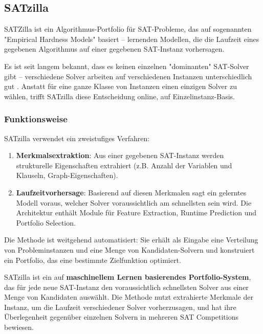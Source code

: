 \newpage

\subsection{SATzilla}

SATZilla ist ein Algorithmus-Portfolio für SAT-Probleme, das auf sogenannten "Empirical Hardness Models" 
basiert – lernenden Modellen, die die Laufzeit eines gegebenen Algorithmus auf einer gegebenen 
SAT-Instanz vorhersagen. \cite{Nudelman2004SATzillaA}

Es ist seit langem bekannt, dass es keinen einzelnen "dominanten" SAT-Solver gibt – verschiedene Solver 
arbeiten auf verschiedenen Instanzen unterschiedlich gut . Anstatt für eine ganze Klasse von Instanzen 
einen einzigen Solver zu wählen, trifft SATzilla diese Entscheidung online, auf Einzelinstanz-Basis.\cite{xu2008satzilla}

\subsubsection{Funktionsweise}

SATzilla verwendet ein zweistufiges Verfahren:

\begin{enumerate}
    \item \textbf{Merkmalsextraktion}: Aus einer gegebenen SAT-Instanz werden strukturelle Eigenschaften extrahiert (z.B. Anzahl der Variablen und Klauseln, Graph-Eigenschaften).
    \item \textbf{Laufzeitvorhersage}: Basierend auf diesen Merkmalen sagt ein gelerntes Modell voraus, welcher Solver voraussichtlich am schnellsten sein wird. Die Architektur enthält Module für Feature Extraction, Runtime Prediction und Portfolio Selection.
\end{enumerate}

Die Methode ist weitgehend automatisiert: Sie erhält als Eingabe eine Verteilung von Probleminstanzen 
und eine Menge von Kandidaten-Solvern und konstruiert ein Portfolio, das eine bestimmte Zielfunktion 
optimiert.

SATzilla ist ein auf \textbf{maschinellem Lernen basierendes Portfolio-System}, das für jede neue SAT-Instanz den 
voraussichtlich schnellsten Solver aus einer Menge von Kandidaten auswählt. Die Methode nutzt extrahierte 
Merkmale der Instanz, um die Laufzeit verschiedener Solver vorherzusagen, und hat ihre Überlegenheit 
gegenüber einzelnen Solvern in mehreren SAT Competitions bewiesen.\cite{xu2008satzilla}

